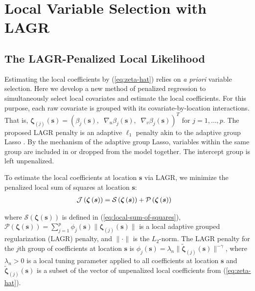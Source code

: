 \documentclass[12pt,english,authoryear, review]{article}\usepackage[]{graphicx}\usepackage[]{color}
\theoremstyle{plain}
\theoremstyle{plain}
\begin{document}
\section{Local Variable Selection with LAGR\label{sec:lagr-gaussian}}


\subsection{The LAGR-Penalized Local Likelihood}

Estimating the local coefficients by (\ref{eq:zeta-hat}) relies on
\emph{a priori} variable selection. Here we develop a new method of
penalized regression to simultaneously select local covariates and
estimate the local coefficients. For this purpose, each raw covariate
is grouped with its covariate-by-location interactions. That is, $\bm{\zeta}_{\left(j\right)}(\bm{s})=\left(\beta_{j}(\bm{s}),\;\;\nabla_{u}\beta_{j}(\bm{s}),\;\;\nabla_{v}\beta_{j}(\bm{s})\right)^{T}$
for $j=1,\dots,p$. The proposed LAGR penalty is an adaptive $\ell_{1}$
penalty akin to the adaptive group Lasso \citep{Wang-Leng-2008,Zou-2006}.
By the mechanism of the adaptive group Lasso, variables within the
same group are included in or dropped from the model together. The
intercept group is left unpenalized.

To estimate the local coefficients at location $\bm{s}$ via LAGR,
we minimize the penalized local sum of squares at location $\bm{s}$:
\begin{align}
\mathcal{J}\left(\bm{\zeta}\left(\bm{s}\right)\right) & =\mathcal{S}\left(\bm{\zeta}\left(\bm{s}\right)\right)+\mathcal{P}\left(\bm{\zeta}\left(\bm{s}\right)\right)\notag\label{eq:adaptive-lasso-WLS}
\end{align}


where $\mathcal{S}\left(\bm{\zeta}\left(\bm{s}\right)\right)$ is
defined in (\ref{eq:local-sum-of-squares}), $\mathcal{P}\left(\bm{\zeta}\left(\bm{s}\right)\right)=\sum_{j=1}^{p}\phi_{j}(\bm{s})\|\bm{\zeta}_{\left(j\right)}(\bm{s})\|$
is a local adaptive grouped regularization (LAGR) penalty, and $\|\cdot\|$
is the $L_{2}$-norm. The LAGR penalty for the $j$th group of coefficients
at location $\bm{s}$ is $\phi_{j}(\bm{s})=\lambda_{n}\|\tilde{\bm{\zeta}}_{\left(j\right)}(\bm{s})\|^{-\gamma}$,
where $\lambda_{n}>0$ is a local tuning parameter applied to all
coefficients at location $\bm{s}$ and $\tilde{\bm{\zeta}}_{\left(j\right)}(\bm{s})$
is a subset of the vector of unpenalized local coefficients from (\ref{eq:zeta-hat}).
\end{document}
